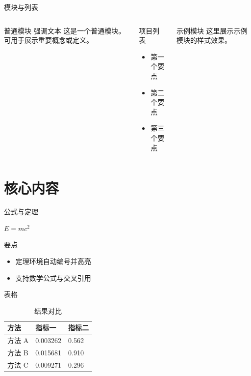 \documentclass[aspectratio=169,xcolor=dvipsnames]{beamer}
\begin{document}
\begin{frame}{模块与列表}
    \begin{columns}[c]
        \begin{block}{普通模块}
            \alert{强调文本} 这是一个普通模块。可用于展示重要概念或定义。
        \end{block}
        \begin{block}{项目列表}
            \begin{itemize}
                \item 第一个要点
                \item 第二个要点
                \item 第三个要点
            \end{itemize}
        \end{block}
        \begin{block}{示例模块}
            这里展示示例模块的样式效果。
        \end{block}
    \end{columns}
\end{frame}

\section{核心内容}

\begin{frame}{公式与定理}
    \begin{theorem}[质能方程]
        $E = mc^2$
    \end{theorem}

    \begin{block}{要点}
        \begin{itemize}
            \item 定理环境自动编号并高亮
            \item 支持数学公式与交叉引用
        \end{itemize}
    \end{block}
\end{frame}

\begin{frame}{表格}
    \begin{table}
        \begin{tabular}{l l l}
            \toprule
            \textbf{方法} & \textbf{指标一} & \textbf{指标二} \\
            \midrule
            方法 A         & 0.003262         & 0.562           \\
            方法 B         & 0.015681         & 0.910           \\
            方法 C         & 0.009271         & 0.296           \\
            \bottomrule
        \end{tabular}
        \caption{结果对比}
    \end{table}
\end{frame}
\end{document}
